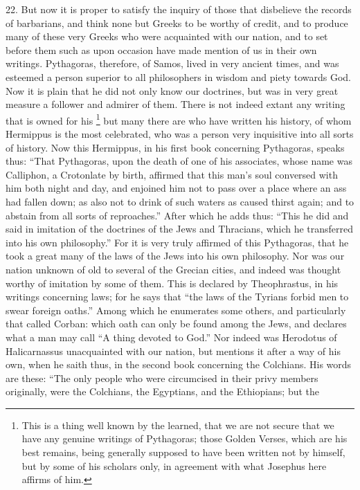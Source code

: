 22. But now it is proper to satisfy the inquiry of those that disbelieve
the records of barbarians, and think none but Greeks to be worthy of
credit, and to produce many of these very Greeks who were acquainted with
our nation, and to set before them such as upon occasion have made mention
of us in their own writings. Pythagoras, therefore, of Samos, lived in
very ancient times, and was esteemed a person superior to all philosophers
in wisdom and piety towards God. Now it is plain that he did not only know
our doctrines, but was in very great measure a follower and admirer of
them. There is not indeed extant any writing that is owned for his \footnote{This is a thing well
known by the learned, that we are not secure that we have any genuine
writings of Pythagoras; those Golden Verses, which are his best remains,
being generally supposed to have been written not by himself, but by some
of his scholars only, in agreement with what Josephus here affirms of
him.}
but many there are who have written his history, of whom Hermippus is the
most celebrated, who was a person very inquisitive into all sorts of
history. Now this Hermippus, in his first book concerning Pythagoras,
speaks thus: ``That Pythagoras, upon the death of one of his associates,
whose name was Calliphon, a Crotonlate by birth, affirmed that this man's
soul conversed with him both night and day, and enjoined him not to pass
over a place where an ass had fallen down; as also not to drink of such
waters as caused thirst again; and to abstain from all sorts of
reproaches.'' After which he adds thus: ``This he did and said in imitation
of the doctrines of the Jews and Thracians, which he transferred into his
own philosophy.'' For it is very truly affirmed of this Pythagoras, that he
took a great many of the laws of the Jews into his own philosophy. Nor was
our nation unknown of old to several of the Grecian cities, and indeed was
thought worthy of imitation by some of them. This is declared by
Theophrastus, in his writings concerning laws; for he says that ``the laws
of the Tyrians forbid men to swear foreign oaths.'' Among which he
enumerates some others, and particularly that called Corban: which oath
can only be found among the Jews, and declares what a man may call ``A
thing devoted to God.'' Nor indeed was Herodotus of Halicarnassus
unacquainted with our nation, but mentions it after a way of his own, when
he saith thus, in the second book concerning the Colchians. His words are
these: ``The only people who were circumcised in their privy members
originally, were the Colchians, the Egyptians, and the Ethiopians; but the
